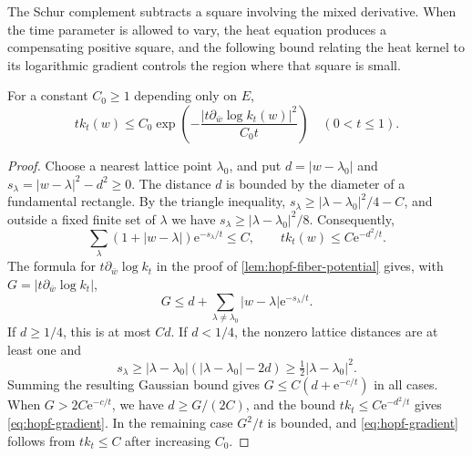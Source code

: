 The Schur complement subtracts a square involving the mixed derivative. When the time parameter is allowed to vary, the heat equation produces a compensating positive square, and the following bound relating the heat kernel to its logarithmic gradient controls the region where that square is small.

\begin{lemma}\label{lem:hopf-gradient}
For a constant $C_0\geq1$ depending only on $E$,
\begin{equation}\label{eq:hopf-gradient}
 tk_t(w)\leq C_0\exp\left(
   -\frac{|t\partial_{\bar w}\log k_t(w)|^2}{C_0t}\right)
 \quad(0<t\leq1).
\end{equation}
\end{lemma}
\begin{proof}
Choose a nearest lattice point $\lambda_0$, and put
$d=|w-\lambda_0|$ and $s_\lambda=|w-\lambda|^2-d^2\geq0$.
The distance $d$ is bounded by the diameter of a fundamental rectangle. By the triangle inequality, $s_\lambda\geq|\lambda-\lambda_0|^2/4-C$, and outside a fixed finite set of $\lambda$ we have $s_\lambda\geq|\lambda-\lambda_0|^2/8$. Consequently,
\[
 \sum_\lambda (1+|w-\lambda|)\mathrm{e}^{-s_\lambda/t}\leq C,
 \qquad tk_t(w)\leq C\mathrm{e}^{-d^2/t}.
\]
The formula for $t\partial_{\bar w}\log k_t$ in the proof of \cref{lem:hopf-fiber-potential} gives, with
$G=|t\partial_{\bar w}\log k_t|$,
\[
 G\leq d+\sum_{\lambda\ne\lambda_0}|w-\lambda|\mathrm{e}^{-s_\lambda/t}.
\]
If $d\geq1/4$, this is at most $Cd$. If $d<1/4$, the nonzero lattice distances are at least one and
\[
 s_\lambda\geq|\lambda-\lambda_0|
                    (|\lambda-\lambda_0|-2d)
              \geq\tfrac12|\lambda-\lambda_0|^2.
\]
Summing the resulting Gaussian bound gives
$G\leq C(d+\mathrm{e}^{-c/t})$ in all cases. When $G>2C\mathrm{e}^{-c/t}$, we have $d\geq G/(2C)$, and the bound $tk_t\leq C\mathrm{e}^{-d^2/t}$ gives \eqref{eq:hopf-gradient}. In the remaining case $G^2/t$ is bounded, and \eqref{eq:hopf-gradient} follows from $tk_t\leq C$ after increasing $C_0$.
\end{proof}

